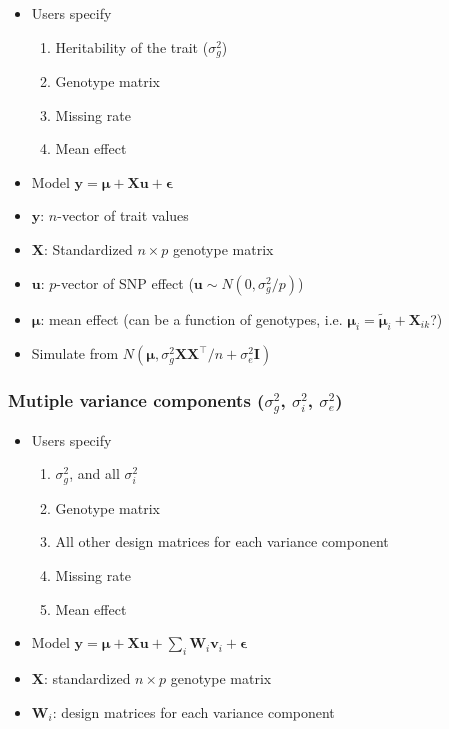 \documentclass[12pt]{article}
\newcommand{\bu}{\boldsymbol{u}}
\newcommand{\bv}{\boldsymbol{v}}
\newcommand{\by}{\boldsymbol{y}}
\newcommand{\bI}{\boldsymbol{I}}
\newcommand{\bW}{\boldsymbol{W}}
\newcommand{\bX}{\boldsymbol{X}}
\newcommand{\T}{\intercal}
\newcommand{\bepsilon}{\boldsymbol{\epsilon}}
\newcommand{\bmu}{\boldsymbol{\mu}}
\begin{document}
\begin{spacing}{1.0}
    \begin{itemize}
        \item Users specify
            \begin{enumerate}
                \item Heritability of the trait ($\sigma^2_g$)
                \item Genotype matrix
                \item Missing rate
                \item Mean effect
            \end{enumerate}
        \item Model $\by = \bmu + \bX \bu + \bepsilon$
        \item $\by$: $n$-vector of trait values
        \item $\bX$: Standardized $n \times p$ genotype matrix
        \item $\bu$: $p$-vector of SNP effect ($\bu \sim N(0, \sigma^2_g / p)$)
        \item $\bmu$: mean effect (can be a function of genotypes, i.e. $\bmu_i = \tilde{\bmu}_{i} +\bX_{ik}$?)
        \item Simulate from
              $N \left(
                      \bmu,
                      \sigma^2_g \bX\bX^\T / n + \sigma^2_e \bI
                  \right)$
    \end{itemize}

\subsubsection{Mutiple variance components ($\sigma^2_g$, $\sigma^2_i$, $\sigma^2_e$)}

    \begin{itemize}
        \item Users specify
            \begin{enumerate}
                \item $\sigma^2_g$, and all $\sigma^2_i$
                \item Genotype matrix
                \item All other design matrices for each variance component
                \item Missing rate
                \item Mean effect
            \end{enumerate}
        \item Model $\by = \bmu + \bX \bu + \sum_i \bW_i \bv_i + \bepsilon$
        \item $\bX$: standardized $n \times p$ genotype matrix
        \item $\bW_i$: design matrices for each variance component
    \end{itemize}


\end{spacing}
\end{document}
